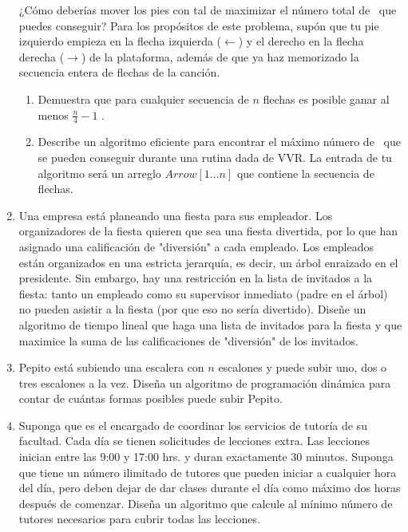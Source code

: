 \documentclass[11pt,letterpaper]{article}
\begin{document}
\begin{enumerate}[leftmargin=*]
    ¿Cómo deberías mover los pies con tal de maximizar el número total de \stylePoints\ que puedes conseguir? Para los propósitos de este problema, supón que tu pie izquierdo empieza en la flecha izquierda ($\leftarrow$) y el derecho en la flecha derecha ($\rightarrow$) de la plataforma, además de que ya haz memorizado la secuencia entera de flechas de la canción.
    
    \begin{enumerate}[label=\alph*)]
        \item Demuestra que para cualquier secuencia de $n$ flechas es posible ganar al menos $\frac{n}{4} - 1$ \stylePoints .
        
        \item Describe un algoritmo eficiente para encontrar el máximo número de \stylePoints\ que se pueden conseguir durante una rutina dada de VVR. La entrada de tu algoritmo será un arreglo $Arrow[1...n]$ que contiene la secuencia de flechas.
    \end{enumerate}
    
    \item Una empresa está planeando una fiesta para sus empleador. Los organizadores de la fiesta quieren que sea una fiesta divertida, por lo que han asignado una calificación de "diversión" a cada empleado. Los empleados están organizados en una estricta jerarquía, es decir, un árbol enraizado en el presidente. Sin embargo, hay una restricción en la lista de invitados a la fiesta: tanto un empleado como su supervisor inmediato (padre en el árbol) no pueden asistir a la fiesta (por que eso no sería divertido). Diseñe un algoritmo de tiempo lineal que haga una lista de invitados para la fiesta y que maximice la suma de las calificaciones de "diversión" de los invitados.
    
    \item Pepito está subiendo una escalera con $n$ escalones y puede subir uno, dos o tres escalones a la vez. Diseña un algoritmo de programación dinámica para contar de cuántas formas posibles puede subir Pepito.
    
    \item Suponga que es el encargado de coordinar los servicios de tutoría de su facultad. Cada día se tienen solicitudes de lecciones extra. Las lecciones inician entre las 9:00 y 17:00 hrs. y duran exactamente 30 minutos. Suponga que tiene un número ilimitado de tutores que pueden iniciar a cualquier hora del día, pero deben dejar de dar clases durante el día como máximo dos horas después de comenzar. Diseña un algoritmo que calcule al mínimo número de tutores necesarios para cubrir todas las lecciones.
    

\end{enumerate}
\end{document}
